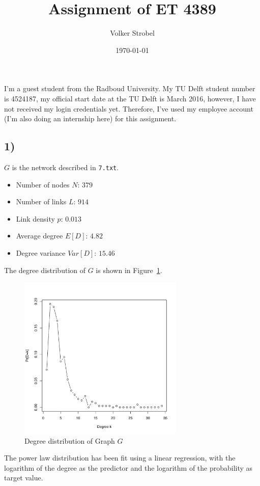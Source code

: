 \documentclass{article}
\title{Assignment of ET 4389}
\author{Volker Strobel}
\date{\today}
\begin{document}
\maketitle

I'm a guest student from the Radboud University. My TU Delft student
number is 4524187, my official start date at the TU Delft is March
2016, however, I have not received my login credentials
yet. Therefore, I've used my employee account (I'm also doing an
internship here) for this assignment.

\subsection*{1)}
$G$ is the network described in \texttt{7.txt}.

\begin{itemize}
  \item Number of nodes $N$: $379$ 
  \item Number of links $L$: $914$
  \item Link density $p$: $0.013$
  \item Average degree $E[D]$: $4.82$
  \item Degree variance $Var[D]$: $15.46$
\end{itemize}
The degree distribution of $G$ is shown in
Figure~\ref{fig:degree-distribution}.
\begin{figure}[H]
  \centering
  \includegraphics[width=0.7\textwidth]{degree_distribution_1}
  \caption{Degree distribution of Graph $G$}
  \label{fig:degree-distribution}
\end{figure}

The power law distribution has been fit using a linear regression,
with the logarithm of the degree as the predictor and the logarithm of
the probability as target value.
\end{document}
